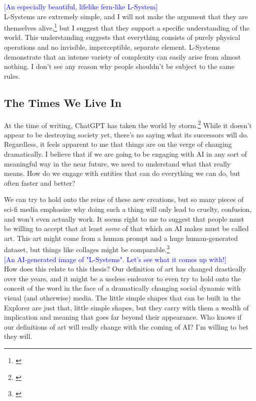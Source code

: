 \documentclass[12pt,twoside]{reedthesis}
\begin{document}
	\textcolor{blue}{[An especially beautiful, lifelike fern-like L-System]}\\
	
	L-Systems are extremely simple, and I will not make the argument that they are themselves alive,\footnote{\cite{theory2004}} but I suggest that they support a specific understanding of the world. This understanding suggests that everything consists of purely physical operations and no invisible, imperceptible, separate element. L-Systems demonstrate that an intense variety of complexity can easily arise from almost nothing. I don't see any reason why people shouldn't be subject to the same rules.

\subsection{The Times We Live In} %
\label{AI-Art}

	At the time of writing, ChatGPT has taken the world by storm.\footnote{\cite{ChatGPT}} While it doesn't appear to be destroying society yet, there's no saying what its successors will do. Regardless, it feels apparent to me that things are on the verge of changing dramatically. I believe that if we are going to be engaging with AI in any sort of meaningful way in the near future, we need to understand what that really means. How do we engage with entities that can do everything we can do, but often faster and better?
	
	We can try to hold onto the reins of these new creations, but so many pieces of sci-fi media emphasize why doing such a thing will only lead to cruelty, confusion, and won't even actually work. It seems right to me to suggest that people must be willing to accept that at least \textit{some} of that which an AI makes must be called art. This art might come from a human prompt and a huge human-generated dataset, but things like collages might be comparable.\footnote{\cite{NYT2023}}\\
	
	\textcolor{blue}{[An AI-generated image of "L-Systems". Let's see what it comes up with!]}\\
	
	How does this relate to this thesis? Our definition of art has changed drastically over the years, and it might be a useless endeavor to even try to hold onto the conceit of the word in the face of a dramatically changing social dynamic with visual (and otherwise) media. The little simple shapes that can be built in the Explorer are just that, little simple shapes, but they carry with them a wealth of implication and meaning that goes far beyond their appearance. Who knows if our definitions of art will really change with the coming of AI? I'm willing to bet they will.
\end{document}
